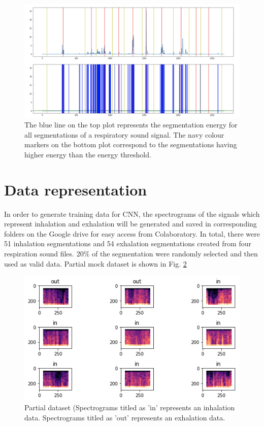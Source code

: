 \begin{figure}[h]
    \centerline{\includegraphics[scale=0.35]{figures/energy.png}}
    \caption{The blue line on the top plot represents the segmentation energy for all segmentations of a respiratory sound signal. The navy colour markers on the bottom plot correspond to the segmentations having higher energy than the energy threshold.}
    \label{fig:energy}
\end{figure}

\section{Data representation}
In order to generate training data for CNN, the spectrograms of the signals which represent inhalation and exhalation will be generated and saved in corresponding folders on the Google drive for easy access from Colaboratory. In total, there were 51 inhalation segmentations and 54 exhalation segmentations created from four respiration sound files. 20\% of the segmentation were randomly selected and then used as valid data. Partial mock dataset is shown in Fig. \ref{fig:dataset}

\begin{figure}[h]
    \centerline{\includegraphics[scale=0.8]{figures/dataset.png}}
    \caption{Partial dataset (Spectrograms titled as 'in' represents an inhalation data. Spectrograms titled as 'out' represents an exhalation data.}
    \label{fig:dataset}
\end{figure}

